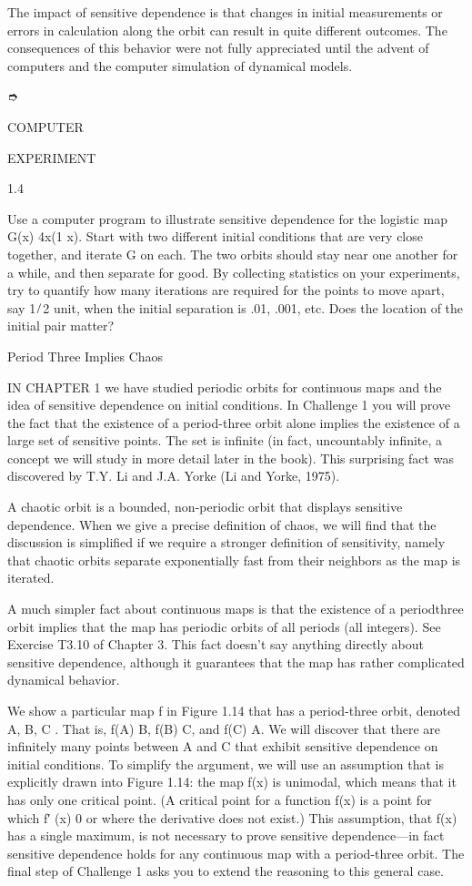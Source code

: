 The impact of sensitive dependence is that changes in initial measurements or errors in calculation along 
the orbit can result in quite different outcomes. The consequences of this behavior were not fully 
appreciated until the advent of computers and the computer simulation of dynamical models.

➮

COMPUTER

EXPERIMENT

1.4

Use a computer program to illustrate sensitive dependence for the logistic map G(x)  4x(1  x). Start with 
two different initial conditions that are very close together, and iterate G on each. The two orbits should 
stay near one another for a while, and then separate for good. By collecting statistics on your 
experiments, try to quantify how many iterations are required for the points to move apart, say 1 ̸ 2 unit, 
when the initial separation is .01, .001, etc. Does the location of the initial pair matter?

Period Three Implies Chaos

IN CHAPTER 1 we have studied periodic orbits for continuous maps and the idea of sensitive dependence on 
initial conditions. In Challenge 1 you will prove the fact that the existence of a period-three orbit alone 
implies the existence of a large set of sensitive points. The set is inﬁnite (in fact, uncountably 
inﬁnite, a concept we will study in more detail later in the book). This surprising fact was discovered by 
T.Y. Li and J.A. Yorke (Li and Yorke, 1975).

A chaotic orbit is a bounded, non-periodic orbit that displays sensitive dependence. When we give a precise 
deﬁnition of chaos, we will ﬁnd that the discussion is simpliﬁed if we require a stronger deﬁnition of 
sensitivity, namely that chaotic orbits separate exponentially fast from their neighbors as the map is 
iterated.

A much simpler fact about continuous maps is that the existence of a periodthree orbit implies that the map 
has periodic orbits of all periods (all integers). See Exercise T3.10 of Chapter 3. This fact doesn’t say 
anything directly about sensitive dependence, although it guarantees that the map has rather complicated 
dynamical behavior.

We show a particular map f in Figure 1.14 that has a period-three orbit, denoted A, B, C  . That is, f(A)  
B, f(B)  C, and f(C)  A. We will discover that there are inﬁnitely many points between A and C that 
exhibit sensitive dependence on initial conditions. To simplify the argument, we will use an assumption 
that is explicitly drawn into Figure 1.14: the map f(x) is unimodal, which means that it has only one 
critical point. (A critical point for a function f(x) is a point for which f′ (x)  0 or where the 
derivative does not exist.) This assumption, that f(x) has a single maximum, is not necessary to prove 
sensitive dependence—in fact sensitive dependence holds for any continuous map with a period-three orbit. 
The ﬁnal step of Challenge 1 asks you to extend the reasoning to this general case.

